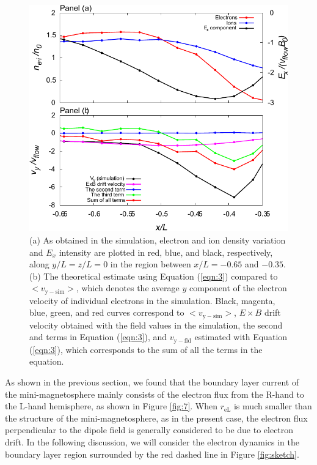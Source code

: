 \documentclass[draft,jgrga]{agutex2015}
\begin{document}
\begin{article}
\begin{figure}
\noindent\includegraphics[width=15cm]{./figures/Fig_8_bb-crop.pdf}
\caption{
(a) As obtained in the simulation, electron and ion density variation and $E_x$ intensity 
are plotted in red, blue, and black, respectively, 
along $y/L=z/L=0$ in the region between $x/L = -0.65$ and $-0.35$. 
(b) The theoretical estimate using Equation (\ref{eqn:3}) compared to 
$<v_\mathrm{y-sim}>$, which denotes the average $y$ component of the electron velocity 
of individual electrons in the simulation.
Black, magenta, blue, green, and red curves correspond to $<v_\mathrm{y-sim}>$, $E \times B$ drift velocity obtained with the field values in the simulation, 
the second and terms in Equation (\ref{eqn:3}), and 
$v_\mathrm{y-fld}$ estimated with Equation (\ref{eqn:3}), which corresponds to
the sum of all the terms in the equation.
}
\label{fig:8}
\end{figure}
As shown in the previous section, 
we found that the boundary layer current of the mini-magnetosphere 
mainly consists of the electron flux from the R-hand to the L-hand hemisphere,
as shown in Figure \ref{fig:7}. 
When $r_\mathrm{eL}$ is much smaller than the structure of the
mini-magnetosphere, as in the present case,
the electron flux perpendicular to the dipole field is 
generally considered to be due to electron drift.
In the following discussion, we will consider the electron dynamics in the boundary layer
region surrounded by
the red dashed line in Figure \ref{fig:sketch}.


\end{article}
\end{document}
